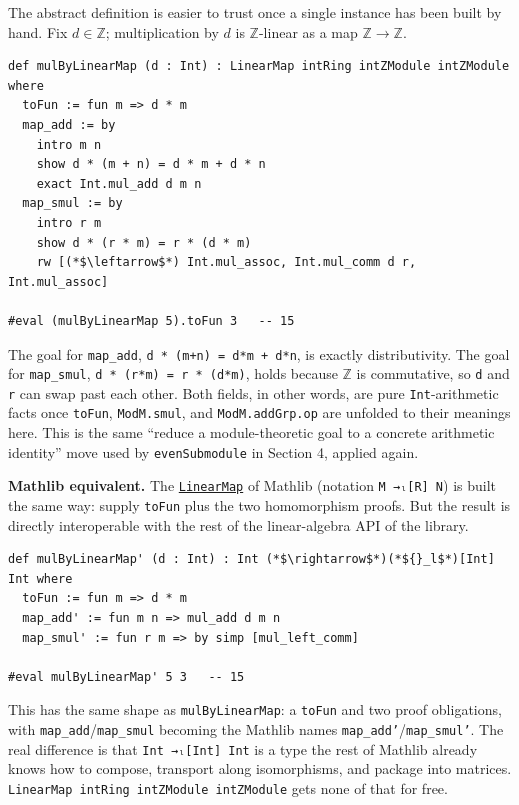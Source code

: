 The abstract definition is easier to trust once a single instance has been built by hand. Fix \(d \in \mathbb{Z}\); multiplication by \(d\) is \(\mathbb{Z}\)-linear as a map \(\mathbb{Z} \to \mathbb{Z}\).

\begin{lstlisting}
def mulByLinearMap (d : Int) : LinearMap intRing intZModule intZModule where
  toFun := fun m => d * m
  map_add := by
    intro m n
    show d * (m + n) = d * m + d * n
    exact Int.mul_add d m n
  map_smul := by
    intro r m
    show d * (r * m) = r * (d * m)
    rw [(*$\leftarrow$*) Int.mul_assoc, Int.mul_comm d r, Int.mul_assoc]

#eval (mulByLinearMap 5).toFun 3   -- 15
\end{lstlisting}

The goal for \texttt{map\_\allowbreak{}add}, \texttt{d * (m+n) = d*m + d*n}, is exactly distributivity. The goal for \texttt{map\_\allowbreak{}smul}, \texttt{d * (r*m) = r * (d*m)}, holds because \(\mathbb{Z}\) is commutative, so \texttt{d} and \texttt{r} can swap past each other. Both fields, in other words, are pure \texttt{Int}-arithmetic facts once \texttt{toFun}, \texttt{ModM.smul}, and \texttt{ModM.addGrp.op} are unfolded to their meanings here. This is the same ``reduce a module-theoretic goal to a concrete arithmetic identity'' move used by \texttt{evenSubmodule} in Section 4, applied again.

\textbf{Mathlib equivalent.} The \href{https://loogle.lean-lang.org/?q=LinearMap}{\texttt{LinearMap}} of Mathlib (notation \texttt{M →ₗ[R] N}) is built the same way: supply \texttt{toFun} plus the two homomorphism proofs. But the result is directly interoperable with the rest of the linear-algebra API of the library.

\begin{lstlisting}
def mulByLinearMap' (d : Int) : Int (*$\rightarrow$*)(*${}_l$*)[Int] Int where
  toFun := fun m => d * m
  map_add' := fun m n => mul_add d m n
  map_smul' := fun r m => by simp [mul_left_comm]

#eval mulByLinearMap' 5 3   -- 15
\end{lstlisting}

This has the same shape as \texttt{mulByLinearMap}: a \texttt{toFun} and two proof obligations, with \texttt{map\_\allowbreak{}add}/\texttt{map\_\allowbreak{}smul} becoming the Mathlib names \texttt{map\_\allowbreak{}add'}/\texttt{map\_\allowbreak{}smul'}. The real difference is that \texttt{Int →ₗ[Int] Int} is a type the rest of Mathlib already knows how to compose, transport along isomorphisms, and package into matrices. \texttt{LinearMap intRing intZModule intZModule} gets none of that for free.
